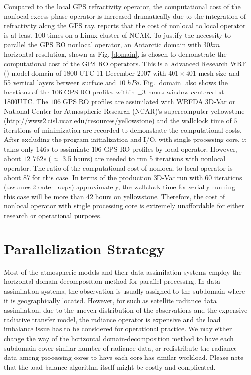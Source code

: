 \documentclass[12pt]{article}
\begin{document}
Compared to the local GPS refractivity operator, the computational cost of the nonlocal excess phase operator is increased dramatically due to the integration of refractivity along the GPS ray. \cite{Liu2008} reports that the cost of nonlocal to local operator is at least $100$ times on a Linux cluster of NCAR. To justify the necessity to parallel the GPS RO nonlocal operator, an Antarctic domain with $30km$ horizontal resolution, shown as Fig. \ref{domain}, is chosen to demonstrate the computational cost of the GPS RO operators. This is a Advanced Research WRF (\cite{Skamarock2008}) model domain of 1800 UTC 11 December 2007 with $401\times401$ mesh size and 55 vertical layers between surface and $10$ $hPa$. Fig. \ref{domain} also shows the locations of the $106$ GPS RO profiles within $\pm3$ hours window centered at 1800UTC. The $106$ GPS RO profiles are assimilated with WRFDA 3D-Var on National Center for Atmospheric Research (NCAR)'s supercomputer yellowstone (http://www2.cisl.ucar.edu/resources/yellowstone) and the wallclock time of 5 iterations of minimization are recorded to demonstrate the computational costs. After excluding the program initialization and I/O, with single processing core, it takes only $146s$ to assimilate $106$ GPS RO profiles by local operator. However, about $12,762s$ ($\approx$ 3.5 hours) are needed to run 5 iterations with nonlocal operator. The ratio of the computational cost of nonlocal to local operator is about 87 for this case. In terms of the production 3D-Var run with 60 iterations (assumes 2 outer loops) approximately, the wallclock time for serially running this case will be more than 42 hours on yellowstone. Therefore, the cost of nonlocal operator with single processing core is extremely unaffordable for either research or operational purposes.

\section{Parallelization Strategy}
\label{sec:strategy}
Most of the atmospheric models and their data assimilation systems employ the horizontal domain-decomposition method for parallel processing. In data assimilation systems, the observation is usually assigned to the subdomain where it is geographically located. However, for such as satellite radiance data assimilation, due to the uneven distribution of the observations and the expensive radiative transfer model, the radiance operator is expensive and the load imbalance issue has to be considered for operational practice. We may either change the way of the horizontal domain-decomposition method to have each subdomain cover similar number of radiance data, or redistribute the radiance data among processing cores to have each core has similar workload. Please note that the load balance algorithm itself might be costly and complicated.
\end{document}

